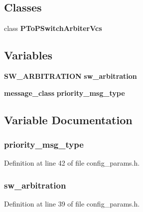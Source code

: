 \subsection*{Classes}
\begin{CompactItemize}
\item 
class {\bf PToPSwitchArbiterVcs}
\end{CompactItemize}
\subsection*{Variables}
\begin{CompactItemize}
\item 
{\bf SW\_\-ARBITRATION} {\bf sw\_\-arbitration}
\item 
{\bf message\_\-class} {\bf priority\_\-msg\_\-type}
\end{CompactItemize}


\subsection{Variable Documentation}
\subsubsection[{priority\_\-msg\_\-type}]{ {\bf priority\_\-msg\_\-type}}\label{ptopSwaVcs_8h_d5a703dac7fa374903a9f220ede1b2d6}




Definition at line 42 of file config\_\-params.h.
\subsubsection[{sw\_\-arbitration}]{ {\bf sw\_\-arbitration}}\label{ptopSwaVcs_8h_045249e2273cf27331b1300b811640ba}




Definition at line 39 of file config\_\-params.h.